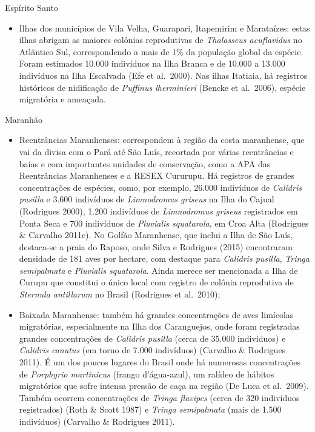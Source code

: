 \documentclass[
]{scrbook}
\providecommand{\tightlist}{%
  \setlength{\itemsep}{0pt}\setlength{\parskip}{0pt}}
\begin{document}
Espírito Santo

\begin{itemize}
\tightlist
\item
  Ilhas dos municípios de Vila Velha, Guarapari, Itapemirim e Marataízes: estas ilhas abrigam as maiores colônias reprodutivas de \emph{Thalasseus acuflavidus} no Atlântico Sul, correspondendo a mais de 1\% da população global da espécie. Foram estimados 10.000 indivíduos na Ilha Branca e de 10.000 a 13.000 indivíduos na Ilha Escalvada (Efe et al.~2000). Nas ilhas Itatiaia, há registros históricos de nidificação de \emph{Puffinus lherminieri} (Bencke et al.~2006), espécie migratória e ameaçada.
\end{itemize}

Maranhão

\begin{itemize}
\item
  Reentrâncias Maranhenses: correspondem à região da costa maranhense, que vai da divisa com o Pará até São Luís, recortada por várias reentrâncias e baías e com importantes unidades de conservação, como a APA das Reentrâncias Maranhenses e a RESEX Cururupu. Há registros de grandes concentrações de espécies, como, por exemplo, 26.000 indivíduos de \emph{Calidris pusilla} e 3.600 indivíduos de \emph{Limnodromus griseus} na Ilha do Cajual (Rodrigues 2000), 1.200 indivíduos de \emph{Limnodromus griseus} registrados em Ponta Seca e 700 indivíduos de \emph{Pluvialis squatarola}, em Croa Alta (Rodrigues \& Carvalho 2011c). No Golfão Maranhense, que inclui a Ilha de São Luís, destaca-se a praia do Raposo, onde Silva e Rodrigues (2015) encontraram densidade de 181 aves por hectare, com destaque para \emph{Calidris pusilla}, \emph{Tringa semipalmata} e \emph{Pluvialis squatarola}. Ainda merece ser mencionada a Ilha de Curupu que constitui o único local com registro de colônia reprodutiva de \emph{Sternula antillarum} no Brasil (Rodrigues et al.~2010);
\item
  Baixada Maranhense: também há grandes concentrações de aves limícolas migratórias, especialmente na Ilha dos Caranguejos, onde foram registradas grandes concentrações de \emph{Calidris pusilla} (cerca de 35.000 indivíduos) e \emph{Calidris canutus} (em torno de 7.000 indivíduos) (Carvalho \& Rodrigues 2011). É um dos poucos lugares do Brasil onde há numerosas concentrações de \emph{Porphyrio martinicus} (frango d'água-azul), um ralídeo de hábitos migratórios que sofre intensa pressão de caça na região (De Luca et al.~2009). Também ocorrem concentrações de \emph{Tringa flavipes} (cerca de 320 indivíduos registrados) (Roth \& Scott 1987) e \emph{Tringa semipalmata} (mais de 1.500 indivíduos) (Carvalho \& Rodrigues 2011).
\end{itemize}
\end{document}
